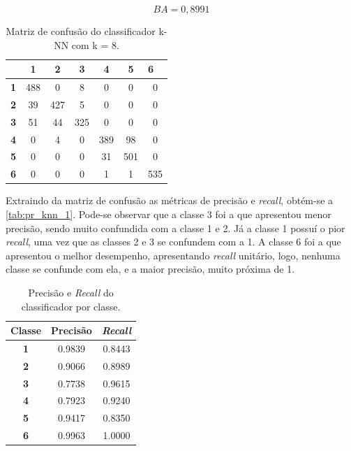 \begin{equation}\label{eq:ba_knn_1}
	BA = 0,8991
\end{equation}

\begin{table}[H]
	\centering
	\begin{tabular}{c||c|c|c|c|c|c|}
		\cline{2-7}
		& \textbf{1} & \textbf{2} & \textbf{3} & \textbf{4} & \textbf{5} & \multicolumn{1}{l|}{\textbf{6}} \\ \hline \hline
		\multicolumn{1}{|c||}{\textbf{1}} & 488 & 0   & 8   & 0   & 0   & 0   \\ \hline
		\multicolumn{1}{|c||}{\textbf{2}} & 39  & 427 & 5   & 0   & 0   & 0   \\ \hline
		\multicolumn{1}{|c||}{\textbf{3}} & 51  & 44  & 325 & 0   & 0   & 0   \\ \hline
		\multicolumn{1}{|c||}{\textbf{4}} & 0   & 4   & 0   & 389 & 98  & 0   \\ \hline
		\multicolumn{1}{|c||}{\textbf{5}} & 0   & 0   & 0   & 31  & 501 & 0   \\ \hline
		\multicolumn{1}{|c||}{\textbf{6}} & 0   & 0   & 0   & 1   & 1   & 535 \\ \hline
	\end{tabular}
	\caption{Matriz de confusão do classificador k-NN com k = 8.}
	\label{tab:mc_knn_1}
\end{table}

Extraindo da matriz de confusão as métricas de precisão e \textit{recall}, obtém-se a \autoref{tab:pr_knn_1}. Pode-se observar que a classe 3 foi a que apresentou menor precisão, sendo muito confundida com a classe 1 e 2. Já a classe 1 possuí o pior \textit{recall}, uma vez que as classes 2 e 3 se confundem com a 1. A classe 6 foi a que apresentou o melhor desempenho, apresentando \textit{recall} unitário, logo, nenhuma classe se confunde com ela, e a maior precisão, muito próxima de 1.


\begin{table}[H]
	\centering
	\begin{tabular}{c|c|c}
		\textbf{Classe} & \textbf{Precisão} & \textbf{\textit{Recall}} \\ \hline
		\textbf{1}      & 0.9839 & 0.8443 \\
		\textbf{2}      & 0.9066 & 0.8989 \\
		\textbf{3}      & 0.7738 & 0.9615 \\
		\textbf{4}      & 0.7923 & 0.9240 \\
		\textbf{5}      & 0.9417 & 0.8350 \\
		\textbf{6}      & 0.9963 & 1.0000
	\end{tabular}
	\caption{Precisão e \textit{Recall} do classificador por classe.}
	\label{tab:pr_knn_1}
\end{table}

